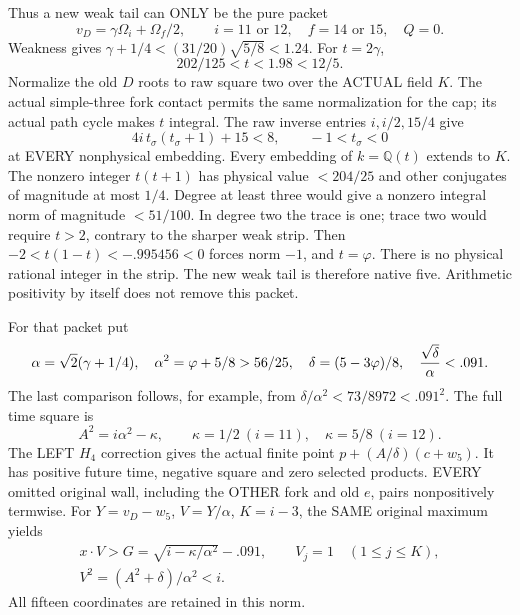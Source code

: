 Thus a new weak tail can ONLY be the pure packet
\[
 v_D=\gamma\Omega_i+\Omega_f/2,\qquad
 i=11\text{ or }12,\quad f=14\text{ or }15,\quad Q=0 .
\]
Weakness gives
\(\gamma+1/4<(31/20)\sqrt{5/8}<1.24\).
For \(t=2\gamma\),
\[
                    202/125<t<1.98<12/5 .
\]
Normalize the old \(D\) roots to raw square two over
the ACTUAL field \(K\).
The actual simple-three fork contact permits the same
normalization for the cap; its actual path cycle makes
\(t\) integral.
The raw inverse entries \(i,i/2,15/4\) give
\[
             4i\,t_\sigma(t_\sigma+1)+15<8,
             \qquad -1<t_\sigma<0
\]
at EVERY nonphysical embedding.
Every embedding of \(k=\mathbb Q(t)\) extends to \(K\).
The nonzero integer \(t(t+1)\) has physical value
\(<204/25\) and other conjugates of magnitude at most \(1/4\).
Degree at least three would give a nonzero integral norm
of magnitude \(<51/100\).
In degree two the trace is one; trace two would require
\(t>2\), contrary to the sharper weak strip.
Then \(-2<t(1-t)<-.995456<0\) forces norm \(-1\),
and \(t=\varphi\).
There is no physical rational integer in the strip.
The new weak tail is therefore native five.
Arithmetic positivity by itself does not remove this packet.

For that packet put
\[
 \alpha=\sqrt2(\gamma+1/4),\quad
 \alpha^2=\varphi+5/8>56/25,\quad
 \delta=(5-3\varphi)/8,\quad
 {\sqrt\delta\over\alpha}<.091 .
\]
The last comparison follows, for example, from
\(\delta/\alpha^2<73/8972<.091^2\).
The full time square is
\[
 A^2=i\alpha^2-\kappa,\qquad
 \kappa=1/2\ (i=11),\quad \kappa=5/8\ (i=12).
\]
The LEFT \(H_4\) correction gives the actual finite point
\(p+(A/\delta)(c+w_5)\).
It has positive future time, negative square and zero
selected products.
EVERY omitted original wall, including the OTHER fork
and old \(e\), pairs nonpositively termwise.
For \(Y=v_D-w_5\), \(V=Y/\alpha\), \(K=i-3\),
the SAME original maximum yields
\[
 \begin{gathered}
 x\cdot V>G=\sqrt{i-\kappa/\alpha^2}-.091,\qquad
 V_j=1\quad(1\le j\le K),\\
 V^2=(A^2+\delta)/\alpha^2<i .
 \end{gathered}
\]
All fifteen coordinates are retained in this norm.

